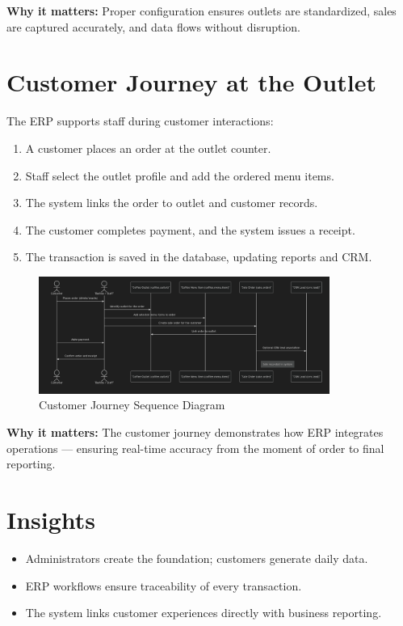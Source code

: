 \textbf{Why it matters:} Proper configuration ensures outlets are standardized, sales are captured accurately, and data flows without disruption.

\section*{Customer Journey at the Outlet}
The ERP supports staff during customer interactions:
\begin{enumerate}
    \item A customer places an order at the outlet counter.  
    \item Staff select the outlet profile and add the ordered menu items.  
    \item The system links the order to outlet and customer records.  
    \item The customer completes payment, and the system issues a receipt.  
    \item The transaction is saved in the database, updating reports and CRM.  
\end{enumerate}

\begin{figure}[H]
    \centering
    \includegraphics[width=0.85\textwidth]{diagrams/customer_journey.png}
    \caption{Customer Journey Sequence Diagram}
\end{figure}

\textbf{Why it matters:} The customer journey demonstrates how ERP integrates operations — ensuring real-time accuracy from the moment of order to final reporting.

\section*{Insights}
\begin{itemize}
    \item Administrators create the foundation; customers generate daily data.  
    \item ERP workflows ensure traceability of every transaction.  
    \item The system links customer experiences directly with business reporting.  
\end{itemize}
